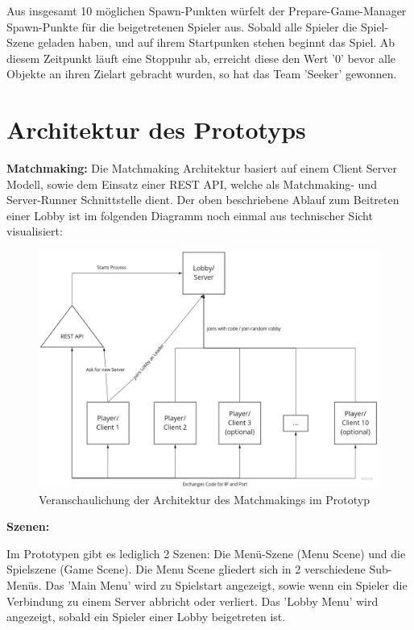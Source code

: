 Aus insgesamt 10 möglichen Spawn-Punkten würfelt der Prepare-Game-Manager Spawn-Punkte für die beigetretenen Spieler aus. Sobald alle Spieler die Spiel-Szene geladen haben, und auf ihrem Startpunken stehen beginnt das Spiel. Ab diesem Zeitpunkt läuft eine Stoppuhr ab, erreicht diese den Wert '0' bevor alle Objekte an ihren Zielart gebracht wurden, so hat das Team 'Seeker' gewonnen.

\section{Architektur des Prototyps}
\label{Architektur}

\textbf{Matchmaking:}
Die Matchmaking Architektur basiert auf einem Client Server Modell, sowie dem Einsatz einer REST API, welche als Matchmaking- und Server-Runner Schnittstelle dient. Der oben beschriebene Ablauf zum Beitreten einer Lobby ist im folgenden Diagramm noch einmal aus technischer Sicht visualisiert:

\begin{figure}[H]
	\centering
	\includegraphics[width=150mm]{images/prototype_architecture_matchmaking.jpg}
	\caption[Architektur Matchmaking Diagramm]{Veranschaulichung der Architektur des Matchmakings im Prototyp}
	\label{pic:prototype_architecture_matchmaking}
\end{figure}

\textbf{Szenen:}

Im Prototypen gibt es lediglich 2 Szenen: Die Menü-Szene (Menu Scene) und die Spielszene (Game Scene).
Die Menu Scene gliedert sich in 2 verschiedene Sub-Menüs. Das 'Main Menu' wird zu Spielstart angezeigt, sowie wenn ein Spieler die Verbindung zu einem Server abbricht oder verliert. Das 'Lobby Menu' wird angezeigt, sobald ein Spieler einer Lobby beigetreten ist. 

